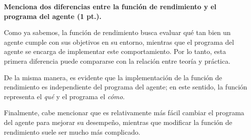 \textbf{Menciona dos diferencias entre la función de rendimiento y el programa del agente (1 pt.).} \vspace{.3cm}

Como ya sabemos, la función de rendimiento busca evaluar qué tan bien un agente cumple con sus objetivos en su entorno, mientras que el programa del agente se encarga de implementar este comportamiento. Por lo tanto, esta primera diferencia puede compararse con la relación entre teoría y práctica.  

De la misma manera, es evidente que la implementación de la función de rendimiento es independiente del programa del agente; en este sentido, la función representa el \textit{qué} y el programa el \textit{cómo}.  

Finalmente, cabe mencionar que es relativamente más fácil cambiar el programa del agente para mejorar su desempeño, mientras que modificar la función de rendimiento suele ser mucho más complicado. \vspace{.3cm}
